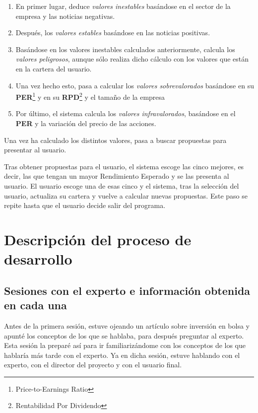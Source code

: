 \documentclass[11pt,openany]{book} %
\begin{document}
\begin{enumerate}[\qquad\color{ocre}{$\bullet$}]
    \item En primer lugar, deduce \textit{\textcolor{ocre}{valores inestables}} basándose en el sector de la empresa y las noticias negativas.
    \item Después,  los \textit{\textcolor{ocre}{valores estables}} basándose en las noticias positivas.
    \item Basándose en los valores inestables calculados anteriormente, calcula los \textit{\textcolor{ocre}{valores peligrosos}}, aunque sólo realiza dicho cálculo con los valores que están en la cartera del usuario.
    \item Una vez hecho esto, pasa a calcular los \textit{\textcolor{ocre}{valores sobrevalorados}} basándose en su \textbf{\textcolor{ocre}{PER}}\footnote{Price-to-Earnings Ratio} y en su \textbf{\textcolor{ocre}{RPD}}\footnote{Rentabilidad Por Dividendo} y el tamaño de la empresa 
    \item Por último, el sistema calcula los \textit{\textcolor{ocre}{valores infravalorados}}, basándose en el \textbf{\textcolor{ocre}{PER}} y la variación del precio de las acciones.
\end{enumerate}

Una vez ha calculado los distintos valores, pasa a buscar propuestas para presentar al usuario.

Tras obtener propuestas para el usuario, el sistema escoge las cinco mejores, es decir, las que tengan un mayor Rendimiento Esperado y se las presenta al usuario. El usuario escoge una de esas cinco y el sistema, tras la selección del usuario, actualiza su cartera y vuelve a calcular nuevas propuestas. Este paso se repite hasta que el usuario decide salir del programa.


\chapter{Descripción del proceso de desarrollo}

\section{Sesiones con el experto e información obtenida en cada una}
Antes de la primera sesión, estuve ojeando un artículo sobre inversión en bolsa y apunté los conceptos de los que se hablaba, para después preguntar al experto. Esta sesión la preparé así para ir familiarizándome con los conceptos de los que hablaría más tarde con el experto. Ya en dicha sesión, estuve hablando con el experto, con el director del proyecto y con el usuario final. 
\end{document}
